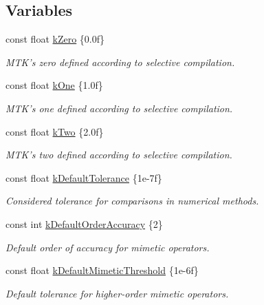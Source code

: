 \subsection*{Variables}
\begin{DoxyCompactItemize}
\item 
const float \hyperlink{group__c01-roots_ga59a451a5fae30d59649bcda274fea271}{k\+Zero} \{0.\+0f\}
\begin{DoxyCompactList}\small\item\em M\+T\+K's zero defined according to selective compilation. \end{DoxyCompactList}\item 
const float \hyperlink{group__c01-roots_ga26407c24d43b6b95480943340d285c71}{k\+One} \{1.\+0f\}
\begin{DoxyCompactList}\small\item\em M\+T\+K's one defined according to selective compilation. \end{DoxyCompactList}\item 
const float \hyperlink{group__c01-roots_gaf39c2d851a2db744f4feb1c5ab3ec2cf}{k\+Two} \{2.\+0f\}
\begin{DoxyCompactList}\small\item\em M\+T\+K's two defined according to selective compilation. \end{DoxyCompactList}\item 
const float \hyperlink{group__c01-roots_gae914b125d81d1b97e0aee7bbc7739786}{k\+Default\+Tolerance} \{1e-\/7f\}
\begin{DoxyCompactList}\small\item\em Considered tolerance for comparisons in numerical methods. \end{DoxyCompactList}\item 
const int \hyperlink{group__c01-roots_ga0d95560098eb36420511103637b6952f}{k\+Default\+Order\+Accuracy} \{2\}
\begin{DoxyCompactList}\small\item\em Default order of accuracy for mimetic operators. \end{DoxyCompactList}\item 
const float \hyperlink{group__c01-roots_ga35718d949bdc81a08a9cc8ebbe3478a2}{k\+Default\+Mimetic\+Threshold} \{1e-\/6f\}
\begin{DoxyCompactList}\small\item\em Default tolerance for higher-\/order mimetic operators. \end{DoxyCompactList}\item 

\end{DoxyCompactItemize}
